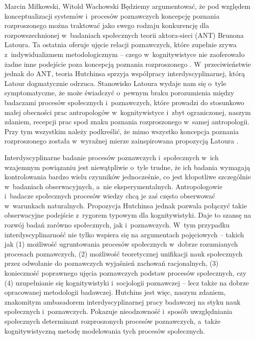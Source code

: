 \begin{artplenv2auth}{Marcin Miłkowski, Witold Wachowski}
Będziemy argumentować, że pod względem konceptualizacji systemów i~procesów poznawczych koncepcję poznania rozproszonego można traktować jako swego rodzaju konkurencję dla rozpowszechnionej w~badaniach społecznych teorii aktora-sieci (ANT) Brunona Latoura. Ta ostatnia oferuje ujęcie relacji poznawczych, które zupełnie zrywa z~indywidualizmem metodologicznym -- czego w~kognitywistyce nie zaoferowało żadne inne podejście poza koncepcją poznania rozproszonego
\parencite[co wykazano w:][]{wachowski_poznanie_2022}. %
 W~przeciwieństwie jednak do ANT, teoria Hutchinsa sprzyja współpracy interdyscyplinarnej, którą Latour dogmatycznie odrzuca. Stanowisko Latoura wydaje nam się o~tyle symptomatyczne, że może świadczyć o~pewnym braku porozumienia między badaczami procesów społecznych i~poznawczych, które prowadzi do stosunkowo małej obecności prac antropologów w~kognitywistyce 
\parencite[][]{nunez_what_2019} %
 i~zbyt ograniczonej, naszym zdaniem, recepcji prac spod znaku poznania rozproszonego w~samej antropologii. Przy tym wszystkim należy podkreślić, że mimo wszystko koncepcja poznania rozproszonego została w~wyraźnej mierze zainspirowana propozycją Latoura 
\parencite[zob. np.][]{hutchins_cognition_2001}.%

\enlargethispage{2\baselineskip}

Interdyscyplinarne badanie procesów poznawczych i~społecznych w~ich wzajemnym powiązaniu jest niewątpliwie o~tyle trudne, że ich badania wymagają kontrolowania bardzo wielu czynników jednocześnie, co jest kłopotliwe szczególnie w~badaniach obserwacyjnych, a~nie eksperymentalnych. Antropologowie i~badacze społecznych procesów wiedzy chcą je zaś często obserwować w~warunkach naturalnych. Propozycja Hutchinsa jednak pozwala połączyć takie obserwacyjne podejście z~rygorem typowym dla kognitywistyki. Daje to szansę na rozwój badań zarówno społecznych, jak i~poznawczych. W~tym przypadku interdyscyplinarność nie tylko wspiera się na argumentach pojęciowych -- takich jak (1) możliwość ugruntowania procesów społecznych w~dobrze rozumianych procesach poznawczych, (2) możliwość teoretycznej unifikacji nauk społecznych przez odwołanie do poznawczych wyjaśnień zachowań racjonalnych, (3) konieczność poprawnego ujęcia poznawczych podstaw procesów społecznych, czy (4) uzupełnianie się kognitywistyki i~socjologii poznawczej
\parencite[por.][]{kaidesoja_arguments_2019} %
 -- lecz także na dobrze opracowanej metodologii badawczej. Hutchins jest więc, naszym zdaniem, znakomitym ambasadorem interdyscyplinarnej pracy badawczej na styku nauk społecznych i~poznawczych. Pokazuje nieodzowność i~sposób uwzględniania społecznych determinant rozproszonych procesów poznawczych, a~także kognitywistyczną metodę modelowania tych procesów społecznych.


\end{artplenv2auth}
